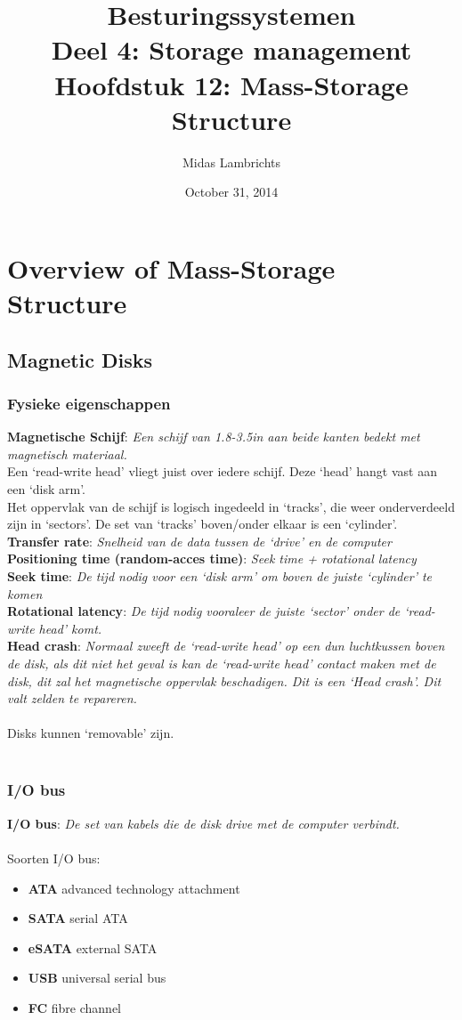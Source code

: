 \documentclass[12pt]{article}
\title{{\Huge Besturingssystemen} \\ {\LARGE Deel 4: Storage management}\\{\Large Hoofdstuk 12: Mass-Storage Structure}}
\date{October 31, 2014}
\author{Midas Lambrichts}
\newcommand{\definition}[2]{\textbf{#1}: \textit{#2}}
\begin{document}
	\begin{titlepage}
		\maketitle
	\end{titlepage}

\section{Overview of Mass-Storage Structure}
\subsection{Magnetic Disks}
\subsubsection{Fysieke eigenschappen}
\definition{Magnetische Schijf}{Een schijf van 1.8-3.5in aan beide kanten bedekt met magnetisch materiaal.} \\
Een `read-write head' vliegt juist over iedere schijf. Deze `head' hangt vast aan een `disk arm'. \\
Het oppervlak van de schijf is logisch ingedeeld in `tracks', die weer onderverdeeld zijn in `sectors'. De set van `tracks' boven/onder elkaar is een `cylinder'. \\
\definition{Transfer rate}{Snelheid van de data tussen de `drive' en de computer}\\
\definition{Positioning time (random-acces time)}{Seek time + rotational latency}\\
\definition{Seek time}{De tijd nodig voor een `disk arm' om boven de juiste `cylinder' te komen}\\
\definition{Rotational latency}{De tijd nodig vooraleer de juiste `sector' onder de `read-write head' komt.} \\
\definition{Head crash}{Normaal zweeft de `read-write head' op een dun luchtkussen boven de disk, als dit niet het geval is kan de `read-write head' contact maken met de disk, dit zal het magnetische oppervlak beschadigen. Dit is een `Head crash'. Dit valt zelden te repareren.} \\ \\
Disks kunnen `removable' zijn. \\ \\
\subsubsection{I/O bus}
\definition{I/O bus}{De set van kabels die de disk drive met de computer verbindt.}
\\ \\
Soorten I/O bus:
\begin{itemize}
	\item \textbf{ATA} advanced technology attachment
	\item \textbf{SATA} serial ATA
	\item \textbf{eSATA} external SATA
	\item \textbf{USB} universal serial bus
	\item \textbf{FC} fibre channel
\end{itemize}
\end{document}
